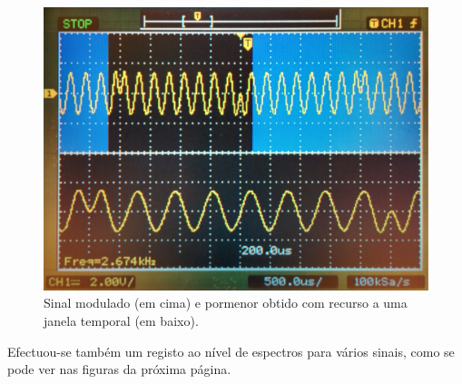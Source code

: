 \documentclass[11pt]{article}
\numberwithin{equation}{section}
\begin{document}
\begin{figure}[H]
	\centering
	\includegraphics[keepaspectratio=true, scale=0.10]{exps/BPSK_modulated}
	\caption{Sinal modulado (em cima) e pormenor obtido com recurso a uma janela temporal (em baixo).}
	\vspace{-0.8em}
\end{figure}

Efectuou-se também um registo ao nível de espectros para vários sinais, como se pode ver nas figuras da próxima página.
\end{document}
